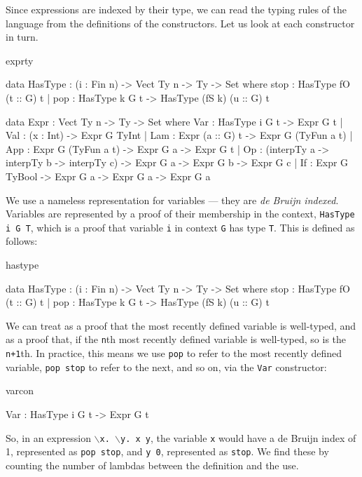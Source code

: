 \noindent
Since expressions are indexed by their type, we can read the typing rules of
the language from the definitions of the constructors. Let us look at each
constructor in turn.

\begin{SaveVerbatim}{exprty}

data HasType : (i : Fin n) -> Vect Ty n -> Ty -> Set where
    stop : HasType fO (t :: G) t
  | pop  : HasType k G t -> HasType (fS k) (u :: G) t

data Expr : Vect Ty n -> Ty -> Set where
    Var : HasType i G t -> Expr G t
  | Val : (x : Int) -> Expr G TyInt
  | Lam : Expr (a :: G) t -> Expr G (TyFun a t)
  | App : Expr G (TyFun a t) -> Expr G a -> Expr G t
  | Op  : (interpTy a -> interpTy b -> interpTy c) -> Expr G a -> Expr G b -> 
          Expr G c
  | If  : Expr G TyBool -> Expr G a -> Expr G a -> Expr G a
  
\end{SaveVerbatim}

\noindent
We use a nameless representation for variables --- they are \emph{de Bruijn indexed}.
Variables are represented by a proof of their membership in the context, 
\texttt{HasType i G T}, which is a proof that variable \texttt{i} in context 
\texttt{G} has type \texttt{T}. This is defined as follows:

\begin{SaveVerbatim}{hastype}

data HasType : (i : Fin n) -> Vect Ty n -> Ty -> Set where
    stop : HasType fO (t :: G) t
  | pop  : HasType k G t -> HasType (fS k) (u :: G) t

\end{SaveVerbatim}

\noindent
We can treat  as a proof that the most recently defined variable is well-typed,
and  as a proof that, if the \texttt{n}th most recently defined variable is
well-typed, so is the \texttt{n+1}th. In practice, this means we use \texttt{pop} to
refer to the most recently defined variable, \texttt{pop stop} to refer to the next, and so on,
via the \texttt{Var} constructor:

\begin{SaveVerbatim}{varcon}

Var : HasType i G t -> Expr G t

\end{SaveVerbatim}

\noindent
So, in an expression \texttt{$\backslash$x. $\backslash$y. x y}, 
the variable \texttt{x} would have a de Bruijn index
of 1, represented as \texttt{pop stop}, and \texttt{y 0}, represented
as \texttt{stop}. We find these by counting the number of lambdas between the
definition and the use.

